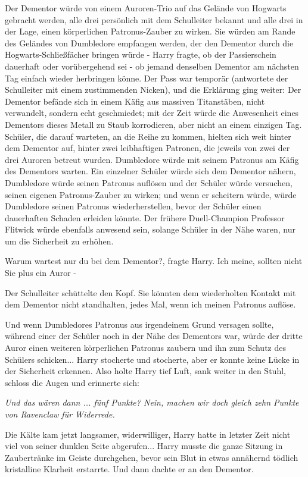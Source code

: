 Der Dementor würde von einem Auroren-Trio auf das Gelände von Hogwarts gebracht
werden, alle drei persönlich mit dem Schulleiter bekannt und alle drei in der
Lage, einen körperlichen Patronus-Zauber zu wirken. Sie würden am Rande des
Geländes von Dumbledore empfangen werden, der den Dementor durch die
Hogwarts-Schließfächer bringen würde - Harry fragte, ob der Passierschein
dauerhaft oder vorübergehend sei - ob jemand denselben Dementor am nächsten Tag
einfach wieder herbringen könne. Der Pass war temporär (antwortete der
Schulleiter mit einem zustimmenden Nicken), und die Erklärung ging weiter: Der
Dementor befände sich in einem Käfig aus massiven Titanstäben, nicht verwandelt,
sondern echt geschmiedet; mit der Zeit würde die Anwesenheit eines Dementors
dieses Metall zu Staub korrodieren, aber nicht an einem einzigen Tag. Schüler,
die darauf warteten, an die Reihe zu kommen, hielten sich weit hinter dem
Dementor auf, hinter zwei leibhaftigen Patronen, die jeweils von zwei der drei
Auroren betreut wurden. Dumbledore würde mit seinem Patronus am Käfig des
Dementors warten. Ein einzelner Schüler würde sich dem Dementor nähern,
Dumbledore würde seinen Patronus auflösen und der Schüler würde versuchen,
seinen eigenen Patronus-Zauber zu wirken; und wenn er scheitern würde, würde
Dumbledore seinen Patronus wiederherstellen, bevor der Schüler einen dauerhaften
Schaden erleiden könnte. Der frühere Duell-Champion Professor Flitwick würde
ebenfalls anwesend sein, solange Schüler in der Nähe waren, nur um die
Sicherheit zu erhöhen.

\glqq Warum wartest nur du bei dem Dementor?\grqq{}, fragte Harry. \glqq Ich
meine, sollten nicht Sie plus ein Auror -\grqq{}

Der Schulleiter schüttelte den Kopf. \glqq Sie könnten dem wiederholten Kontakt
mit dem Dementor nicht standhalten, jedes Mal, wenn ich meinen Patronus
auflöse.\grqq{}

Und wenn Dumbledores Patronus aus irgendeinem Grund versagen sollte, während
einer der Schüler noch in der Nähe des Dementors war, würde der dritte Auror
einen weiteren körperlichen Patronus zaubern und ihn zum Schutz des Schülers
schicken... Harry stocherte und stocherte, aber er konnte keine Lücke in der
Sicherheit erkennen. Also holte Harry tief Luft, sank weiter in den Stuhl,
schloss die Augen und erinnerte sich:

\emph{\glqq Und das wären dann ... fünf Punkte? Nein, machen wir doch gleich
zehn Punkte von Ravenclaw für Widerrede.}\grqq{}

Die Kälte kam jetzt langsamer, widerwilliger, Harry hatte in letzter Zeit nicht
viel von seiner dunklen Seite abgerufen... Harry musste die ganze Sitzung in
Zaubertränke im Geiste durchgehen, bevor sein Blut in etwas annähernd tödlich
kristalline Klarheit erstarrte. Und dann dachte er an den Dementor.


